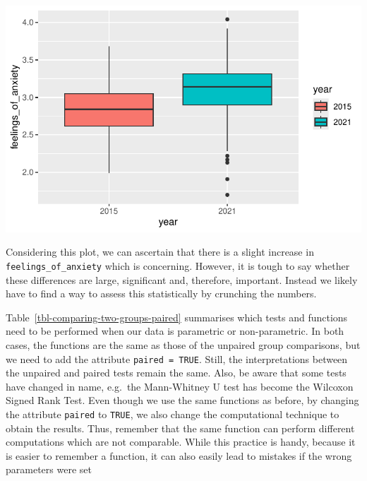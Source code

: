 \documentclass[
  letterpaper,
]{krantz}
\begin{document}
\includegraphics{11_group_comparison_files/figure-pdf/two-paired-groups-boxplot-1.pdf}

Considering this plot, we can ascertain that there is a slight increase
in \texttt{feelings\_of\_anxiety} which is concerning. However, it is
tough to say whether these differences are large, significant and,
therefore, important. Instead we likely have to find a way to assess
this statistically by crunching the numbers.

Table~\ref{tbl-comparing-two-groups-paired} summarises which tests and
functions need to be performed when our data is parametric or
non-parametric. In both cases, the functions are the same as those of
the unpaired group comparisons, but we need to add the attribute
\texttt{paired\ =\ TRUE}. Still, the interpretations between the
unpaired and paired tests remain the same. Also, be aware that some
tests have changed in name, e.g.~the Mann-Whitney U test has become the
Wilcoxon Signed Rank Test. Even though we use the same functions as
before, by changing the attribute \texttt{paired} to \texttt{TRUE}, we
also change the computational technique to obtain the results. Thus,
remember that the same function can perform different computations which
are not comparable. While this practice is handy, because it is easier
to remember a function, it can also easily lead to mistakes if the wrong
parameters were set
\end{document}
